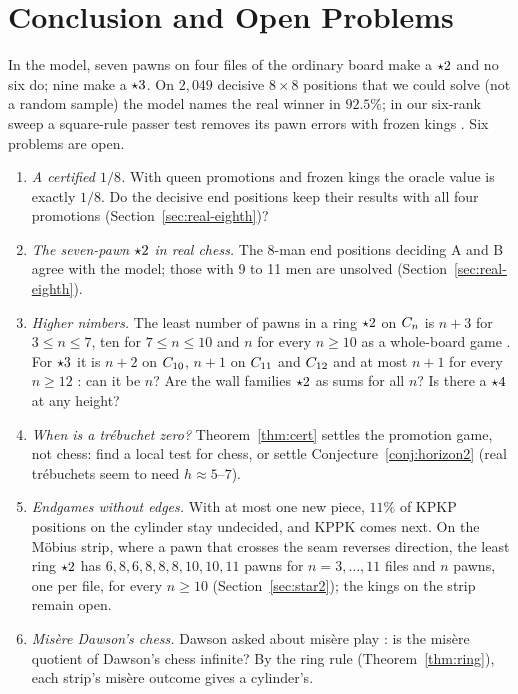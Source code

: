 \section{Conclusion and Open Problems}\label{sec:conclusion}

In the model, seven pawns on four files of the ordinary board make a $\mathord{\star2}$ and no six do; nine make a
$\mathord{\star3}$. On $2{,}049$ decisive $8\times8$ positions that we could solve (not a random sample) the model names the real winner in $92.5\%$; in our six-rank sweep a
square-rule passer test removes its pawn errors with frozen kings . Six problems are open.

\begin{enumerate}
\item \emph{A certified $1/8$.} With queen promotions and frozen kings the oracle value is exactly $1/8$. Do
  the decisive end positions keep their results with all four promotions (Section~\ref{sec:real-eighth})?
\item \emph{The seven-pawn $\mathord{\star2}$ in real chess.} The 8-man end positions deciding A and B agree with the
  model; those with 9 to 11 men are unsolved
  (Section~\ref{sec:real-eighth}).
\item \emph{Higher nimbers.} The least number of pawns in a ring $\mathord{\star2}$ on $C_{n}$ is $n+3$ for $3\le n\le7$,
  ten for $7\le n\le10$  and $n$ for every $n\ge10$ as a whole-board game . For $\mathord{\star3}$ it is $n+2$ on $C_{10}$, $n+1$ on $C_{11}$ and $C_{12}$  and at
  most $n+1$ for every $n\ge12$ : can it be $n$? Are the wall
  families $\mathord{\star2}$ as sums for all $n$? Is there a $\mathord{\star4}$ at any height?
\item \emph{When is a tr\'ebuchet zero?} Theorem~\ref{thm:cert} settles the promotion game, not chess: find a
  local test for chess, or settle Conjecture~\ref{conj:horizon2} (real tr\'ebuchets seem to need $h\approx5$--$7$).
\item \emph{Endgames without edges.} With at most one new piece, $11\%$ of KPKP positions on the cylinder
  stay undecided, and KPPK comes next. On the M\"obius strip, where a pawn that crosses
  the seam reverses direction, the least ring $\mathord{\star2}$ has $6, 8, 6, 8, 8, 8, 10, 10, 11$ pawns for $n=3,\dots,11$
  files  and $n$ pawns, one per file, for every $n\ge10$  (Section~\ref{sec:star2}); the kings on the
  strip remain open.
\item \emph{Mis\`ere Dawson's chess.} Dawson asked about mis\`ere play \cite{Dawson1935}: is the mis\`ere
  quotient \cite{PlambeckSiegel2008} of Dawson's chess infinite? By the ring rule (Theorem~\ref{thm:ring}), each
  strip's mis\`ere outcome gives a cylinder's.
\end{enumerate}
